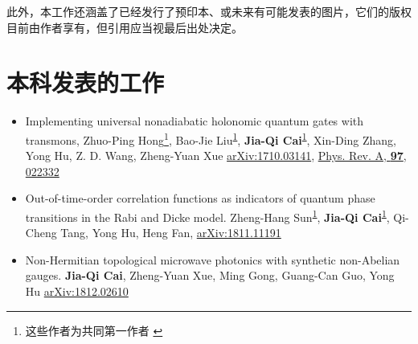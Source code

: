 \documentclass[supercite]{HustGraduPaper}
\begin{document}
	此外，本工作还涵盖了已经发行了预印本\cite{sun2018out,cai2018non}、或未来有可能发表的图片\cite{Qihaotomography}，它们的版权目前由作者享有，但引用应当视最后出处决定。
	\section{本科发表的工作}
	\begin{itemize}
		\item \label{nonadia}Implementing universal nonadiabatic holonomic quantum gates with transmons,
		Zhuo-Ping Hong\footnote{这些作者为共同第一作者 \label{equal}}, Bao-Jie Liu\textsuperscript{\ref{equal}}, \textbf{Jia-Qi Cai}\textsuperscript{\ref{equal}}, Xin-Ding Zhang, Yong Hu, Z. D. Wang, Zheng-Yuan Xue \href{https://arxiv.org/abs/1710.03141}{arXiv:1710.03141},  \href{https://link.aps.org/doi/10.1103/PhysRevA.97.022332}{Phys. Rev. A, {\bf 97}, 022332} 
		\item \label{OTOC}
		Out-of-time-order correlation functions as indicators of quantum phase transitions in the Rabi and Dicke model. Zheng-Hang Sun\textsuperscript{\ref{equal}}, \textbf{Jia-Qi Cai}\textsuperscript{\ref{equal}}, Qi-Cheng Tang, Yong Hu, Heng Fan,  \href{https://arxiv.org/abs/1811.11191}{arXiv:1811.11191}
		\item \label{SOC} Non-Hermitian topological microwave photonics with synthetic non-Abelian gauges. \textbf{Jia-Qi Cai}, Zheng-Yuan Xue, Ming Gong, Guang-Can Guo, Yong Hu \href{https://arxiv.org/abs/1812.02610}{arXiv:1812.02610}
	\end{itemize}
	\nocite{*}
	
	
\end{document}
